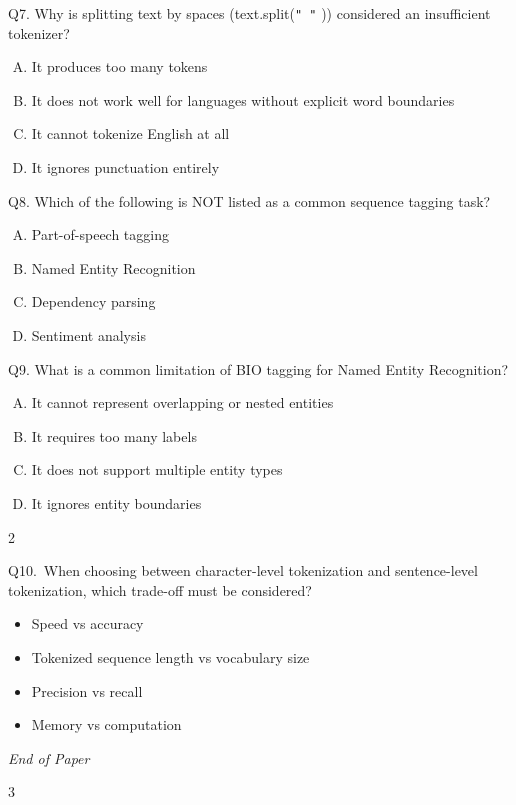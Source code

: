 \documentclass[11pt]{article}
\begin{document}
Q7. Why is splitting text by spaces (text.split(\texttt{" "} )) considered an insufficient tokenizer?

\begin{enumerate}[(A)]
\item It produces too many tokens
\item It does not work well for languages without explicit word boundaries
\item It cannot tokenize English at all
\item It ignores punctuation entirely
\end{enumerate}

Q8. Which of the following is NOT listed as a common sequence tagging task?

\begin{enumerate}[(A)]
\item Part-of-speech tagging
\item Named Entity Recognition
\item Dependency parsing
\item Sentiment analysis
\end{enumerate}

Q9. What is a common limitation of BIO tagging for Named Entity Recognition?

\begin{enumerate}[(A)]
\item It cannot represent overlapping or nested entities
\item It requires too many labels
\item It does not support multiple entity types
\item It ignores entity boundaries
\end{enumerate}

\begin{center}
2
\end{center}

\clearpage

Q10.\ When choosing between character-level tokenization and sentence-level tokenization, which trade-off must be considered?

\begin{itemize}
\item[(A)] Speed vs accuracy
\item[(B)] Tokenized sequence length vs vocabulary size
\item[(C)] Precision vs recall
\item[(D)] Memory vs computation
\end{itemize}

\bigskip

\textit{End of Paper}

\begin{center}
3
\end{center}
\end{document}
